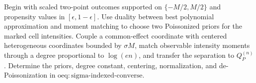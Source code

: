 Begin with scaled two-point outcomes supported on \(\{-M/2,M/2\}\) and propensity values in \([\epsilon,1-\epsilon]\). Use duality between best polynomial approximation and moment matching to choose two Poissonized priors for the marked cell intensities. Couple a common-effect coordinate with centered heterogeneous coordinates bounded by \(\sigma M\), match observable intensity moments through a degree proportional to \(\log(en)\), and transfer the separation to \(Q_P^{(n)}\). Determine the priors, degree constant, centering, normalization, and de-Poissonization in \(\mathrm{oeq:sigma\text{-}indexed\text{-}converse}\).